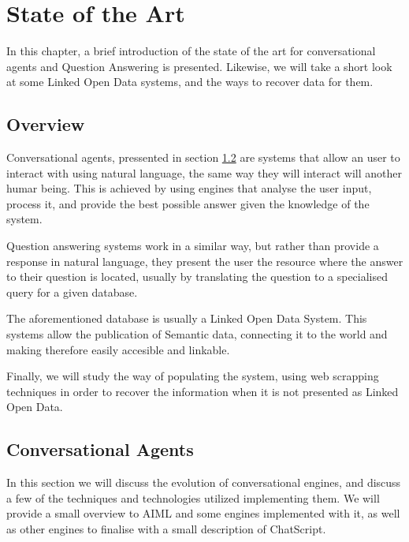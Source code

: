 \chapter{State of the Art}
\label{chap:state_of_the_art}

\begin{chapterintro}

In this chapter, a brief introduction of the state of the art for conversational agents and Question Answering is presented. Likewise, we will take a short look at some Linked Open Data systems, and the ways to recover data for them.


\end{chapterintro}

\cleardoublepage

\section{Overview}


Conversational agents, pressented in section \ref{sec:conv_agents} are systems that allow an user to interact with using natural language, the same way they will interact will another humar being. This is achieved by using engines that analyse the user input, process it, and provide the best possible answer given the knowledge of the system.

Question answering systems work in a similar way, but rather than provide a response in natural language, they present the user the resource where the answer to their question is located, usually by translating the question to a specialised query for a given database.

The aforementioned database is usually a Linked Open Data System. This systems allow the publication of Semantic data, connecting it to the world and making therefore easily accesible and linkable.

Finally, we will study the way of populating the system, using web scrapping techniques in order to recover the information when it is not presented as Linked Open Data.

\section{Conversational Agents}
\label{sec:conv_agents}

In this section we will discuss the evolution of conversational engines, and discuss a few of the techniques and technologies utilized implementing them. We will provide a small overview to \ac{AIML} and some engines implemented with it, as well as other engines to finalise with a small description of ChatScript.

